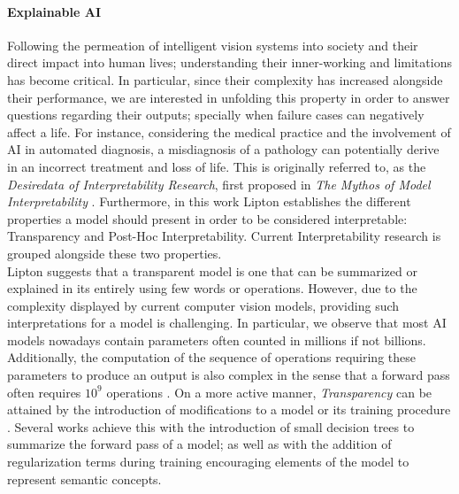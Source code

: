 \paragraph{Explainable AI} Following the permeation of intelligent vision systems into society and 
their direct impact into human lives; understanding their inner-working and limitations has become 
critical. In particular, since their complexity has increased alongside their performance, we are 
interested in unfolding this property in order to answer questions regarding their outputs; 
specially when failure cases can negatively affect a life. For instance, considering the medical 
practice and the involvement of AI in automated diagnosis, a misdiagnosis of a pathology can 
potentially derive in an incorrect treatment and loss of life. This is originally referred to, as the 
\emph{Desiredata of Interpretability Research}, first proposed in \emph{The Mythos of Model 
Interpretability} \autocite{mythos_interp}. Furthermore, in this work Lipton establishes the 
different properties a model should present in order to be considered interpretable: Transparency 
and Post-Hoc Interpretability. Current Interpretability research is grouped alongside these 
two properties.\\

\noindent Lipton suggests that a transparent model is one that can be summarized or explained 
in its entirely using few words or operations. However, due to the complexity displayed by current 
computer vision models, providing such interpretations for a model is challenging. In particular, 
we observe that most AI models nowadays contain parameters often counted in millions if not 
billions. Additionally, the computation of the sequence of operations requiring these parameters 
to produce an output is also complex in the sense that a forward pass often requires $10^9$ 
operations \autocite{openai_compute}. On a more active manner, \emph{Transparency} can be attained 
by the introduction of modifications to a model or its training procedure 
\autocite{zhang2021survey}. Several works achieve this with the introduction of small decision 
trees to summarize the forward pass of a model; as well as with the addition of regularization terms 
during training encouraging elements of the model to represent semantic concepts.\\


